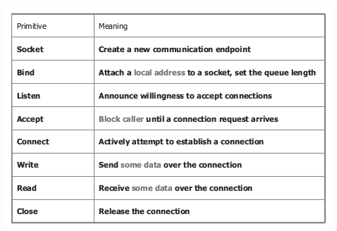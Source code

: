 \documentclass[a4paper,12pt, oneside]{book}
\begin{document}
\begin{center}
	\includegraphics[scale=3]{img/sc3.png}
\end{center}
\end{document}
